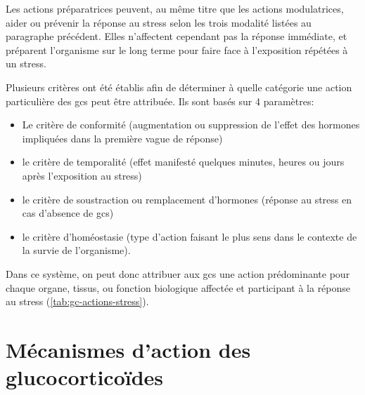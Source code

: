 \documentclass[../main.tex]{subfiles}
\begin{document}
Les actions préparatrices peuvent, au même titre que les actions modulatrices, aider ou prévenir la réponse au stress selon les trois modalité listées au paragraphe précédent.
Elles n'affectent cependant pas la réponse immédiate, et préparent l'organisme sur le long terme pour faire face à l'exposition répétées à un stress.
\par
Plusieurs critères ont été établis afin de déterminer à quelle catégorie une action particulière des \glspl{gc} peut être attribuée.
Ils sont basés sur 4 paramètres:
\begin{itemize}
\item Le critère de conformité (augmentation ou suppression de l'effet des hormones impliquées dans la première vague de réponse)
\item le critère de temporalité (effet manifesté quelques minutes, heures ou jours après l'exposition au stress)
\item le critère de soustraction ou remplacement d'hormones (réponse au stress en cas d'absence de \glspl{gc})
\item le critère d'homéostasie (type d'action faisant le plus sens dans le contexte de la survie de l'organisme).
\end{itemize}
Dans ce système, on peut donc attribuer aux \glspl{gc} une action prédominante pour chaque organe, tissus, ou fonction biologique affectée et participant à la réponse au stress (\autoref{tab:gc-actions-stress}).









\section{Mécanismes d'action des glucocorticoïdes}

\end{document}
